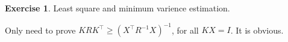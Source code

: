 \documentclass[11pt,a4paper]{report}
\theoremstyle{definition}\newtheorem{exercise}{Exercise}[chapter]
\begin{document}
\begin{exercise}Least square and minimum varience estimation.\\
\end{exercise}
\begin{answer}
    Only need to prove $K RK^\top \geq (X^\top R^{-1} X)^{-1}$, for all $KX=I$. It is obvious.
\end{answer}

















\end{document}
